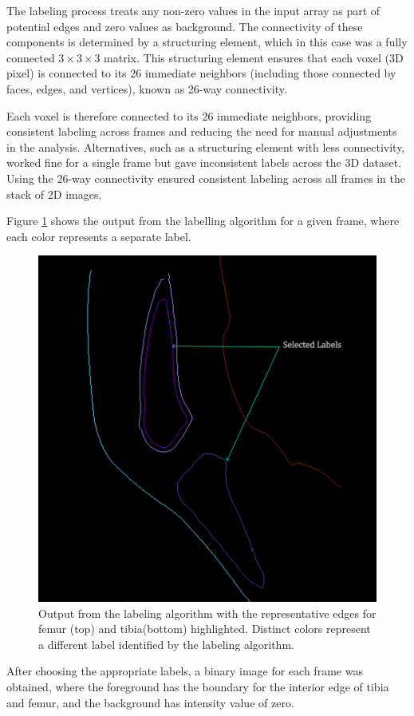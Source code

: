 \documentclass{micro-econ-thesis}
\begin{document}
The labeling process treats any non-zero values in the input array as part of potential edges and zero values as background. The connectivity of these components is determined by a structuring element, which in this case was a fully connected $3\times3\times3$ matrix. This structuring element ensures that each voxel (3D pixel) is connected to its 26 immediate neighbors (including those connected by faces, edges, and vertices), known as 26-way connectivity.

Each voxel is therefore connected to its 26 immediate neighbors, providing consistent labeling across frames and reducing the need for manual adjustments in the analysis. Alternatives, such as a structuring element with less connectivity, worked fine for a single frame but gave inconsistent labels across the 3D dataset. Using the 26-way connectivity ensured consistent labeling across all frames in the stack of 2D images. 

Figure \ref{fig:labelimg} shows the output from the labelling algorithm for a given frame, where each color represents a separate label. 

\begin{figure}[H]
	\centering
	\includegraphics[width=0.7\linewidth]{label_selected}
	\caption{Output from the labeling algorithm with the representative edges for femur (top) and tibia(bottom) highlighted. Distinct colors represent a different label identified by the labeling algorithm.}
	\label{fig:labelimg}
\end{figure}
 
After choosing the appropriate labels, a binary image for each frame was obtained, where the foreground has the boundary for the interior edge of tibia and femur, and the background has intensity value of zero.   
\end{document}
